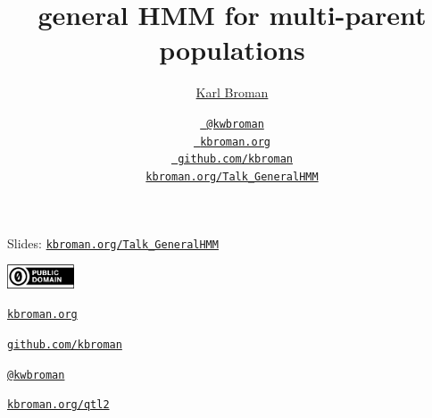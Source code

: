 \documentclass[aspectratio=169,12pt,t]{beamer}
\title{general HMM for multi-parent populations}
\author{\vspace*{-10pt} \href{https://kbroman.org}{Karl Broman}}
\institute{Biostatistics \& Medical Informatics, UW{\textendash}Madison}
\date{\href{https://twitter.com/kwbroman}{\tt \scriptsize \color{foreground} @kwbroman}
\\[-4pt]
\href{https://kbroman.org}{\tt \scriptsize \color{foreground} kbroman.org}
\\[-4pt]
\href{https://github.com/kbroman}{\tt \scriptsize \color{foreground} github.com/kbroman}
\\[-4pt]
{\scriptsize \href{https://kbroman.org/Talk_GeneralHMM}{\tt kbroman.org/Talk\_GeneralHMM}}
}
\begin{document}
{
 }



\begin{frame}{}

\Large

Slides: \href{https://kbroman.org/Talk_GeneralHMM}{\tt kbroman.org/Talk\_GeneralHMM}

\vspace*{-7mm}
\hfill
\href{https://creativecommons.org/publicdomain/zero/1.0/}{\includegraphics[height=7mm]{Figs/cc-zero.png}}

\vspace{-1mm}

\href{https://kbroman.org}{\tt \lolit kbroman.org}

\vspace{1mm}

\href{https://github.com/kbroman}{\tt \lolit github.com/kbroman}

\vspace{1mm}

\href{https://twitter.com/kwbroman}{\tt \lolit @kwbroman}

\vspace{1mm}

\href{https://kbroman.org/qtl2}{\tt \lolit kbroman.org/qtl2}



\end{frame}
\end{document}
